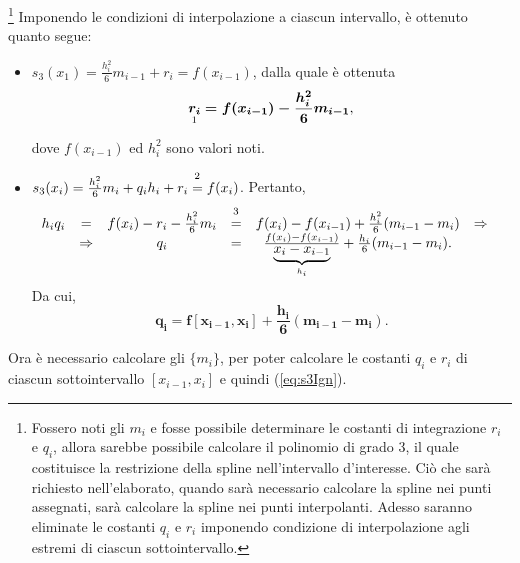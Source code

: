 \noindent\footnote{Fossero noti gli $m_i$ e fosse possibile determinare le costanti di integrazione $r_i$ e $q_i$, allora sarebbe possibile calcolare il polinomio di grado 3, il quale costituisce la restrizione della spline nell'intervallo d'interesse. Ciò che sarà richiesto nell'elaborato, quando sarà necessario calcolare la spline nei punti assegnati, sarà calcolare la spline nei punti interpolanti. Adesso saranno eliminate le costanti $q_i$ e $r_i$ imponendo condizione di interpolazione agli estremi di ciascun sottointervallo.}
Imponendo le condizioni di interpolazione a ciascun intervallo, è ottenuto quanto segue:
\begin{itemize}
    \item $s_3(x_1)=\frac{h_i^2}{6}m_{i-1}+r_i=f(x_{i-1})$, dalla quale è ottenuta
    \begin{equation}\label{eq:ri}
        \underset{\footnotemark}{\boldsymbol{r_i}}\boldsymbol{=f(x_{i-1})-\frac{h_i^2}{6}m_{i-1}},
    \end{equation}
    dove $f(x_{i-1})$ ed $h_i^2$ sono valori noti.
    \item $s_3(x_i)=\frac{h_i^2}{6}m_i+q_ih_i+r_i\overset{\footnotemark}{=}f(x_i)$. Pertanto,
    \begin{equation*}
        \begin{matrix}
             h_iq_i &=& f(x_i)-r_i-\frac{h_i^2}{6}m_i &\overset{\footnotemark}{=}& f(x_i)-f(x_{i-1})+\frac{h_i^2}{6}(m_{i-1}-m_i) &\Rightarrow&\\
            &\Rightarrow& q_i &=& \frac{f(x_i)-f(x_{i-1})}{\underbrace{x_i-x_{i-1}}_{h_i}}+\frac{h_i}{6}(m_{i-1}-m_i).&&
        \end{matrix}
    \end{equation*}
    Da cui,
    \begin{equation}\label{eq:qi}
        \boldsymbol{q_i=f[x_{i-1},x_i]+\frac{h_i}{6}(m_{i-1}-m_i).}
    \end{equation}
\end{itemize}
\addtocounter{footnote}{-2}



Ora è necessario calcolare gli $\{m_i\}$, per poter calcolare le costanti $q_i$ e $r_i$ di ciascun sottointervallo $[x_{i-1},x_i]$ e quindi (\ref{eq:s3Ign}).


